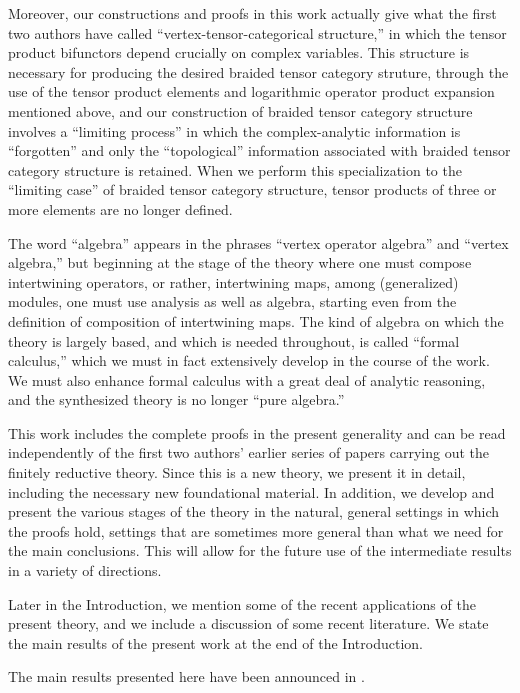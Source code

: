 \documentclass[12pt]{article}
\begin{document}
Moreover, our constructions and proofs in this work actually give what
the first two authors have called ``vertex-tensor-categorical
structure,'' in which the tensor product bifunctors depend crucially
on complex variables.  This structure is necessary for producing the
desired braided tensor category struture, through the use of the
tensor product elements and logarithmic operator product expansion
mentioned above, and our construction of braided tensor category
structure involves a ``limiting process'' in which the
complex-analytic information is ``forgotten'' and only the
``topological'' information associated with braided tensor category
structure is retained.  When we perform this specialization to the
``limiting case'' of braided tensor category structure, tensor
products of three or more elements are no longer defined.

The word ``algebra'' appears in the phrases ``vertex operator
algebra'' and ``vertex algebra,'' but beginning at the stage of the
theory where one must compose intertwining operators, or rather,
intertwining maps, among (generalized) modules, one must use analysis
as well as algebra, starting even from the definition of composition
of intertwining maps.  The kind of algebra on which the theory is
largely based, and which is needed throughout, is called ``formal
calculus,'' which we must in fact extensively develop in the course of
the work.  We must also enhance formal calculus with a great deal of
analytic reasoning, and the synthesized theory is no longer ``pure
algebra.''

This work includes the complete proofs in the present generality and
can be read independently of the first two authors' earlier series of
papers carrying out the finitely reductive theory.  Since this is a
new theory, we present it in detail, including the necessary new
foundational material.  In addition, we develop and present the
various stages of the theory in the natural, general settings in which
the proofs hold, settings that are sometimes more general than
what we need for the main conclusions.  This will allow for the future
use of the intermediate results in a variety of directions.

Later in the Introduction, we mention some of
the recent applications of the present theory, and we 
include a discussion of some recent literature. We state the main results 
of the present work at the end of the Introduction.

The main results presented here have been announced in \cite{HLZ}.
\end{document}
